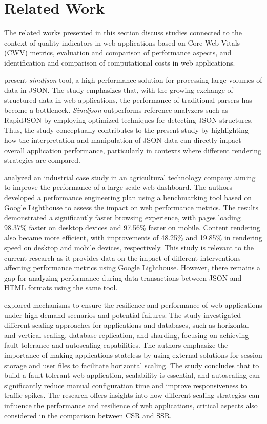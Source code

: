 \section{Related Work}
\label{sec:related_work}

The related works presented in this section discuss studies connected to the context of quality indicators in web applications based on Core Web Vitals (CWV) metrics, evaluation and comparison of performance aspects, and identification and comparison of computational costs in web applications.

\citet{parsingJson:2019} present  \textit{simdjson} tool, a high-performance solution for processing large volumes of data in JSON. The study emphasizes that, with the growing exchange of structured data in web applications, the performance of traditional parsers has become a bottleneck. \textit{Simdjson} outperforms reference analyzers such as RapidJSON by employing optimized techniques for detecting JSON structures. Thus, the study conceptually contributes to the present study by highlighting how the interpretation and manipulation of JSON data can directly impact overall application performance, particularly in contexts where different rendering strategies are compared.

\citet{webPerformanceOptimize:2023} analyzed an industrial case study in an agricultural technology company aiming to improve the performance of a large-scale web dashboard. The authors developed a performance engineering plan using a benchmarking tool based on Google Lighthouse to assess the impact on web performance metrics. The results demonstrated a significantly faster browsing experience, with pages loading 98.37\% faster on desktop devices and 97.56\% faster on mobile. Content rendering also became more efficient, with improvements of 48.25\% and 19.85\% in rendering speed on desktop and mobile devices, respectively. This study is relevant to the current research as it provides data on the impact of different interventions affecting performance metrics using Google Lighthouse. However, there remains a gap for analyzing performance during data transactions between JSON and HTML formats using the same tool.

\citet{webAutoscaling:2022} explored mechanisms to ensure the resilience and performance of web applications under high-demand scenarios and potential failures. The study investigated different scaling approaches for applications and databases, such as horizontal and vertical scaling, database replication, and sharding, focusing on achieving fault tolerance and autoscaling capabilities. The authors emphasize the importance of making applications stateless by using external solutions for session storage and user files to facilitate horizontal scaling. The study concludes that to build a fault-tolerant web application, scalability is essential, and autoscaling can significantly reduce manual configuration time and improve responsiveness to traffic spikes. The research offers insights into how different scaling strategies can influence the performance and resilience of web applications, critical aspects also considered in the comparison between CSR and SSR.

